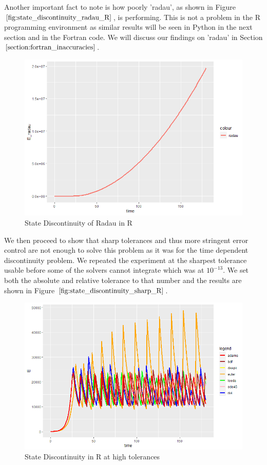 Another important fact to note is how poorly 'radau', as shown in Figure $\ref{fig:state_discontinuity_radau_R}$, is performing. This is not a problem in the R programming environment as similar results will be seen in Python in the next section and in the Fortran code. We will discuss our findings on 'radau' in Section $\ref{section:fortran_inaccuracies}$.

\begin{figure}[h]
	\centering
	\includegraphics[width=0.7\linewidth]{./figures/state_discontinuity_radau_R}
	\caption{State Discontinuity of Radau in R}
	\label{fig:state_discontinuity_radau_R}
\end{figure}

We then proceed to show that sharp tolerances and thus more stringent error control are not enough to solve this problem as it was for the time dependent discontinuity problem. We repeated the experiment at the sharpest tolerance usable before some of the solvers cannot integrate which was at $10^{-13}$. We set both the absolute and relative tolerance to that number and the results are shown in Figure $\ref{fig:state_discontinuity_sharp_R}$.

\begin{figure}[h]
	\centering
	\includegraphics[width=0.7\linewidth]{./figures/state_discontinuity_sharp_R}
	\caption{State Discontinuity in R at high tolerances}
	\label{fig:state_discontinuity_sharp_R}
\end{figure}

